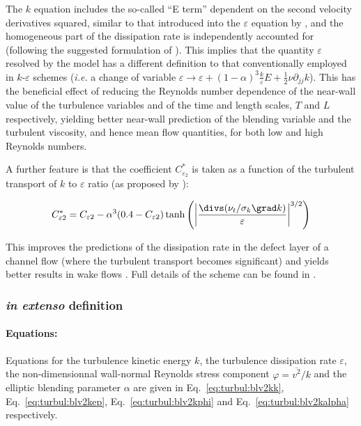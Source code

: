 The $k$ equation includes the so-called ``E term'' dependent on the second velocity
derivatives squared, similar to that introduced into the $\varepsilon$ equation
by \cite{Jones:1972}, and the homogeneous part of the dissipation rate is
independently accounted for (following the suggested formulation of \cite{Jakirlic:2002}).
This implies that the quantity $\varepsilon$ resolved by the model has a different definition
to that conventionally employed in $k$-$\varepsilon$ schemes (\emph{i.e.} a change of
variable $\varepsilon \to \varepsilon + (1-\alpha)^3\frac{k}{\varepsilon}E+\frac{1}{2}\nu\partial_{jj}k$).
This has the beneficial effect of reducing the Reynolds number dependence of the near-wall
value of the turbulence variables and of the time and length scales, $T$ and $L$ respectively,
yielding better near-wall prediction of the blending variable and the turbulent viscosity,
and hence mean flow quantities, for both low and high Reynolds numbers.

A further feature is that the coefficient $C_{\varepsilon_2}^*$ is taken as a function
of the turbulent transport of $k$ to $\varepsilon$ ratio  (as proposed by \cite{parneix1996second}):

\begin{equation}
  C_{\varepsilon 2}^* = C_{\varepsilon 2}
- \alpha^3 (0.4-C_{\varepsilon 2}) \tanh \left( \left|  \frac{\divs (\nu_t / \sigma_k \grad k)}{\varepsilon}   \right| ^{3/2}  \right)
\end{equation}

This improves the predictions of the dissipation rate in the defect layer of a channel flow (where the turbulent transport becomes significant) and yields better results in wake flows \cite{parneix1996second}. Full details of the scheme can be found in \cite{Billard:2012}.

\subsubsection{\emph{in extenso} definition}

\paragraph{Equations:}
Equations for the turbulence kinetic energy $k$, the turbulence dissipation rate $\varepsilon$,
the non-dimensionnal wall-normal Reynolds stress component $\varphi=\overline{v^2}/k$ and
the elliptic blending parameter $\alpha$ are given in Eq.~\eqref{eq:turbul:blv2kk},
Eq.~\eqref{eq:turbul:blv2kep},  Eq.~\eqref{eq:turbul:blv2kphi} and Eq.~\eqref{eq:turbul:blv2kalpha} respectively.

